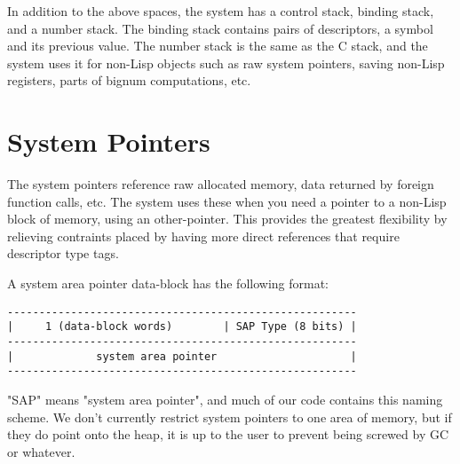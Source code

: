 In addition to the above spaces, the system has a control stack, binding stack,
and a number stack.  The binding stack contains pairs of descriptors, a symbol
and its previous value.  The number stack is the same as the C stack, and the
system uses it for non-Lisp objects such as raw system pointers, saving
non-Lisp registers, parts of bignum computations, etc.



\section{System Pointers}

The system pointers reference raw allocated memory, data returned by foreign
function calls, etc.  The system uses these when you need a pointer to a
non-Lisp block of memory, using an other-pointer.  This provides the greatest
flexibility by relieving contraints placed by having more direct references
that require descriptor type tags.

A system area pointer data-block has the following format:
\begin{verbatim}
-------------------------------------------------------
|     1 (data-block words)        | SAP Type (8 bits) |
-------------------------------------------------------
|             system area pointer                     |
-------------------------------------------------------
\end{verbatim}

"SAP" means "system area pointer", and much of our code contains this naming
scheme.  We don't currently restrict system pointers to one area of memory, but
if they do point onto the heap, it is up to the user to prevent being screwed
by GC or whatever.
